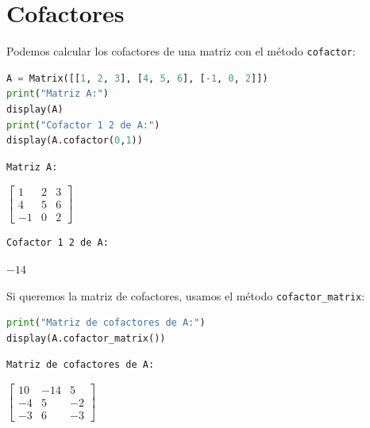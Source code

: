 \documentclass[a4,11pt]{aleph-notas}
\begin{document}
\encabezado


\section{Cofactores}

Podemos calcular los cofactores de una matriz con el método \texttt{cofactor}:

\begin{pycodigo}
    \begin{ipynbcodigo}\begin{lstlisting}[language=Python]
A = Matrix([[1, 2, 3], [4, 5, 6], [-1, 0, 2]])
print("Matriz A:")
display(A)
print("Cofactor 1 2 de A:")
display(A.cofactor(0,1))
    \end{lstlisting}\end{ipynbcodigo}
    \begin{ipynbsalida}
    \begin{Verbatim}[commandchars=\\\{\}]
Matriz A:
    \end{Verbatim}

    $\displaystyle \left[\begin{matrix}1 & 2 & 3\\4 & 5 & 6\\-1 & 0 & 2\end{matrix}\right]$

    
    \begin{Verbatim}[commandchars=\\\{\}]
Cofactor 1 2 de A:
    \end{Verbatim}

    $\displaystyle -14$
    \end{ipynbsalida}
\end{pycodigo}
    
Si queremos la matriz de cofactores, usamos el método \texttt{cofactor\_matrix}:
\begin{pycodigo}
    \begin{ipynbcodigo}\begin{lstlisting}[language=Python]
print("Matriz de cofactores de A:")
display(A.cofactor_matrix())
    \end{lstlisting}\end{ipynbcodigo}
    \begin{ipynbsalida}
    \begin{Verbatim}[commandchars=\\\{\}]
Matriz de cofactores de A:
    \end{Verbatim}

    $\displaystyle \left[\begin{matrix}10 & -14 & 5\\-4 & 5 & -2\\-3 & 6 & -3\end{matrix}\right]$
    \end{ipynbsalida}
\end{pycodigo}
\end{document}
